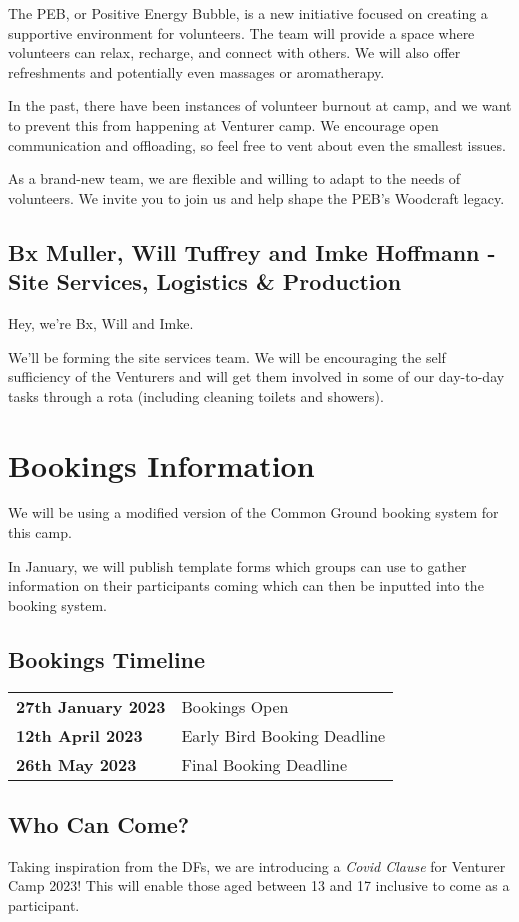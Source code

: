 \documentclass[a4paper, 10pt]{report}
\begin{document}
The PEB, or Positive Energy Bubble, is a new initiative focused on creating a supportive environment for volunteers. The team will provide a space where volunteers can relax, recharge, and connect with others. We will also offer refreshments and potentially even massages or aromatherapy.

In the past, there have been instances of volunteer burnout at camp, and we want to prevent this from happening at Venturer camp. We encourage open communication and offloading, so feel free to vent about even the smallest issues.

As a brand-new team, we are flexible and willing to adapt to the needs of volunteers. We invite you to join us and help shape the PEB's Woodcraft legacy.

\section{Bx Muller, Will Tuffrey and Imke Hoffmann - Site Services, Logistics \& Production}
Hey, we're Bx, Will and Imke.

We'll be forming the site services team. We will be encouraging the self sufficiency of the Venturers and will get them involved in some of our day-to-day tasks through a rota (including cleaning toilets and showers).

\chapter{Bookings Information}
We will be using a modified version of the Common Ground booking system for this camp.

In January, we will publish template forms which groups can use to gather information on their participants coming which can then be inputted into the booking system.
\section{Bookings Timeline}
\begin{table}[H]
    \centering
\begin{tabularx}{\textwidth}{ll}
    \textbf{27th January 2023} & Bookings Open \\
    \textbf{12th April 2023} & Early Bird Booking Deadline \\
    \textbf{26th May 2023} & Final Booking Deadline
\end{tabularx}
\end{table}

\section{Who Can Come?}
Taking inspiration from the DFs, we are introducing a \textit{Covid Clause} for Venturer Camp 2023! This will enable those aged between 13 and 17 inclusive to come as a participant.
\end{document}
